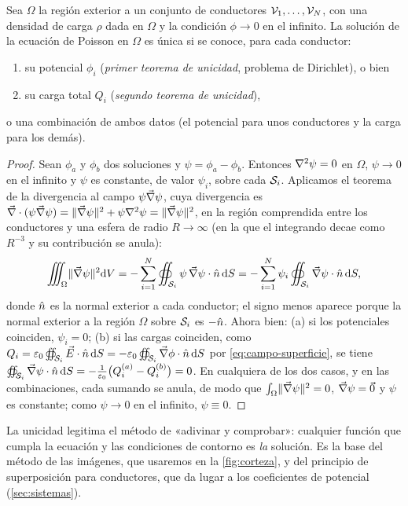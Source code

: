 \begin{teorema}\label{teo:unicidad}
Sea $\Omega$ la región exterior a un conjunto de conductores $\mathcal{V}_1,\dots,\mathcal{V}_N$, con una densidad de carga $\rho$ dada en $\Omega$ y la condición
$\phi\to0$ en el infinito. La solución de la ecuación de Poisson en $\Omega$ es única si se conoce, para cada conductor:
\begin{enumerate}[label=\textup{(\alph*)}]
  \item su potencial $\phi_i$ (\emph{primer teorema de unicidad}, problema de Dirichlet), o bien
  \item su carga total $Q_i$ (\emph{segundo teorema de unicidad}),
\end{enumerate}
o una combinación de ambos datos (el potencial para unos conductores y la carga para los demás).
\end{teorema}
\begin{proof}
Sean $\phi_a$ y $\phi_b$ dos soluciones y $\psi=\phi_a-\phi_b$. Entonces $\nabla^{2}\psi=0$ en $\Omega$, $\psi\to0$ en el infinito y $\psi$ es constante, de
valor $\psi_i$, sobre cada $\mathcal{S}_i$. Aplicamos el teorema de la divergencia al campo $\psi\vec{\nabla}\psi$, cuya divergencia es
$\vec{\nabla}\cdot(\psi\vec{\nabla}\psi)=\lVert \vec{\nabla}\psi\rVert^{2}+\psi\nabla^{2}\psi=\lVert \vec{\nabla}\psi\rVert^{2}$, en la región comprendida entre los conductores y una esfera de radio
$R\to\infty$ (en la que el integrando decae como $R^{-3}$ y su contribución se anula):
\[
  \iiint_{\Omega}\lVert \vec{\nabla}\psi\rVert^{2}\mathrm{d} V=-\sum_{i=1}^{N}\oiint_{\mathcal{S}_i}\psi\,\vec{\nabla}\psi\cdot\hat{n}\,\mathrm{d} S
  =-\sum_{i=1}^{N}\psi_i\oiint_{\mathcal{S}_i}\vec{\nabla}\psi\cdot\hat{n}\,\mathrm{d} S ,
\]
donde $\hat{n}$ es la normal exterior a cada conductor; el signo menos aparece porque la normal exterior a la región $\Omega$ sobre $\mathcal{S}_i$ es
$-\hat{n}$. Ahora bien: (a) si los potenciales coinciden, $\psi_i=0$; (b) si las cargas coinciden, como $Q_i=\varepsilon_{0}\oiint_{\mathcal{S}_i}\vec{E}\cdot\hat{n}\,\mathrm{d} S
=-\varepsilon_{0}\oiint_{\mathcal{S}_i}\vec{\nabla}\phi\cdot\hat{n}\,\mathrm{d} S$ por \cref{eq:campo-superficie}, se tiene
$\oiint_{\mathcal{S}_i}\vec{\nabla}\psi\cdot\hat{n}\,\mathrm{d} S=-\frac{1}{\varepsilon_{0}}\bigl(Q_i^{(a)}-Q_i^{(b)}\bigr)=0$. En cualquiera de los dos casos, y en las combinaciones, cada sumando se
anula, de modo que $\int_{\Omega}\lVert \vec{\nabla}\psi\rVert^{2}=0$, $\vec{\nabla}\psi=\vec{0}$ y $\psi$ es constante; como $\psi\to0$ en el infinito, $\psi\equiv0$.
\end{proof}

\begin{observacion}\label{obs:unicidad}
La unicidad legitima el método de «adivinar y comprobar»: cualquier función que cumpla la ecuación y las condiciones de contorno es \emph{la}
solución. Es la base del método de las imágenes, que usaremos en la \cref{fig:corteza}, y del principio de superposición para conductores,
que da lugar a los coeficientes de potencial (\cref{sec:sistemas}).
\end{observacion}

